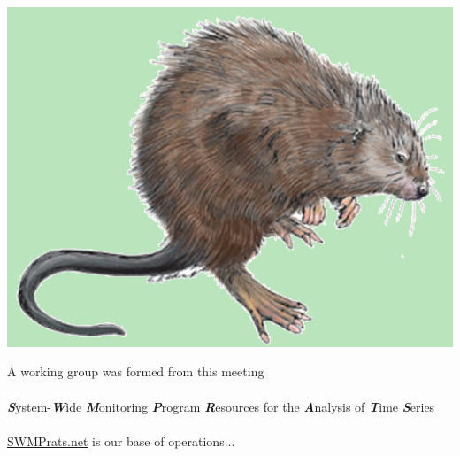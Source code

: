 \documentclass[serif]{beamer}\usepackage[]{graphicx}\usepackage[]{color}
\newcommand{\Bigtxt}[1]{\textbf{\textit{#1}}}
\begin{document}
\begin{frame}{\includegraphics[width=0.05\paperwidth]{fig/muskrat.png}\hspace{0.07in}{\bf Genesis of SWMPrats}}
\centerline{}
\vspace{0.2in}
A working group was formed from this meeting \\~\\
\Large
\Bigtxt{S}ystem-\Bigtxt{W}ide \Bigtxt{M}onitoring \Bigtxt{P}rogram \Bigtxt{R}esources for the \Bigtxt{A}nalysis of \Bigtxt{T}ime \Bigtxt{S}eries \\~\\
\normalsize
\href{http://swmprats.net}{SWMPrats.net} is our base of operations...
\end{frame}
\end{document}
